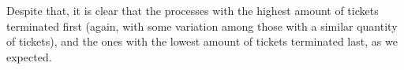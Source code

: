 \documentclass[12pt]{article}
\begin{document}
Despite that, it is clear that the processes with the highest amount of
tickets terminated first (again, with some variation among
those with a similar quantity of tickets), and the ones with the lowest
amount of tickets terminated last, as we expected.



\end{document}
